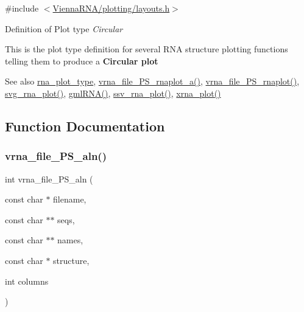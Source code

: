 {\ttfamily \#include $<$\hyperlink{layouts_8h}{Vienna\+R\+N\+A/plotting/layouts.\+h}$>$}



Definition of Plot type {\itshape Circular} 

This is the plot type definition for several R\+NA structure plotting functions telling them to produce a {\bfseries Circular plot}

\begin{DoxySeeAlso}{See also}
\hyperlink{group__plotting__utils_ga5964c4581431b098b80027d6e14dcdd4}{rna\+\_\+plot\+\_\+type}, \hyperlink{group__plotting__utils_ga139a31dd0ba9fc6612431f67de901c31}{vrna\+\_\+file\+\_\+\+P\+S\+\_\+rnaplot\+\_\+a()}, \hyperlink{group__plotting__utils_gabdc8f6548ba4a3bc3cd868ccbcfdb86a}{vrna\+\_\+file\+\_\+\+P\+S\+\_\+rnaplot()}, \hyperlink{group__plotting__utils_gae7853539b5df98f294b4af434e979304}{svg\+\_\+rna\+\_\+plot()}, \hyperlink{group__plotting__utils_ga70834bc8c0aad4fe6824ff76ccb8f329}{gml\+R\+N\+A()}, \hyperlink{group__plotting__utils_gadd368528755f9a830727b680243541df}{ssv\+\_\+rna\+\_\+plot()}, \hyperlink{group__plotting__utils_ga2f6d5953e6a323df898896b8d6614483}{xrna\+\_\+plot()} 
\end{DoxySeeAlso}


\subsection{Function Documentation}
\mbox{\label{group__plotting__utils_ga76b5c0637db9385a553cdd8e66e61eca}} 
\subsubsection{\texorpdfstring{vrna\+\_\+file\+\_\+\+P\+S\+\_\+aln()}{vrna\_file\_PS\_aln()}}
{\footnotesize\ttfamily int vrna\+\_\+file\+\_\+\+P\+S\+\_\+aln (\begin{DoxyParamCaption}\item[{const char $\ast$}]{filename,  }\item[{const char $\ast$$\ast$}]{seqs,  }\item[{const char $\ast$$\ast$}]{names,  }\item[{const char $\ast$}]{structure,  }\item[{int}]{columns }\end{DoxyParamCaption})}



